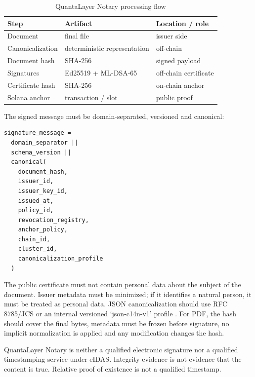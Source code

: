 \documentclass[11pt,a4paper,oneside,parskip=false]{scrartcl}
\begin{document}
\begin{table}[htbp]
\centering
\caption{QuantaLayer Notary processing flow}
\label{tab:notary-flow}
\small
\begin{tabularx}{\textwidth}{L{0.22\textwidth}Y Y}
\toprule
\textbf{Step} & \textbf{Artifact} & \textbf{Location / role} \\
\midrule
Document & final file & issuer side \\
Canonicalization & deterministic representation & off-chain \\
Document hash & SHA-256 & signed payload \\
Signatures & Ed25519 + ML-DSA-65 & off-chain certificate \\
Certificate hash & SHA-256 & on-chain anchor \\
Solana anchor & transaction / slot & public proof \\
\bottomrule
\end{tabularx}
\end{table}

The signed message must be domain-separated, versioned and canonical:

\begin{lstlisting}
signature_message =
  domain_separator ||
  schema_version ||
  canonical(
    document_hash,
    issuer_id,
    issuer_key_id,
    issued_at,
    policy_id,
    revocation_registry,
    anchor_policy,
    chain_id,
    cluster_id,
    canonicalization_profile
  )
\end{lstlisting}

The public certificate must not contain personal data about the subject of the document. Issuer metadata must be minimized; if it identifies a natural person, it must be treated as personal data. JSON canonicalization should use RFC 8785/JCS or an internal versioned `json-c14n-v1' profile \cite{rfc8785}. For PDF, the hash should cover the final bytes, metadata must be frozen before signature, no implicit normalization is applied and any modification changes the hash.

QuantaLayer Notary is neither a qualified electronic signature nor a qualified timestamping service under eIDAS. Integrity evidence is not evidence that the content is true. Relative proof of existence is not a qualified timestamp.
\end{document}
